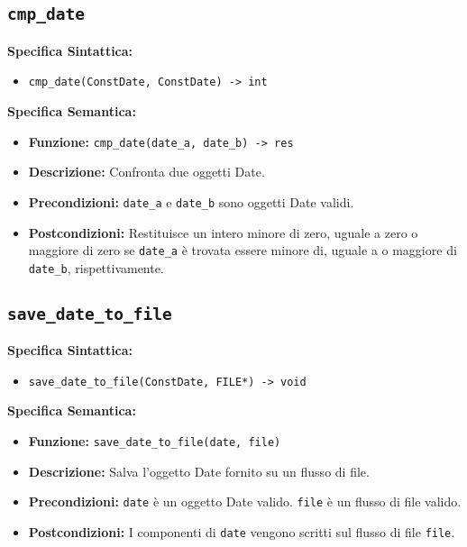 \documentclass{article}
\begin{document}

\subsection{\texttt{cmp\_date}}

\textbf{Specifica Sintattica:}
\begin{itemize}
    \item \texttt{cmp\_date(ConstDate, ConstDate) -> int}
\end{itemize}

\textbf{Specifica Semantica:}
\begin{itemize}
    \item \textbf{Funzione:} \texttt{cmp\_date(date\_a, date\_b) -> res}
    \item \textbf{Descrizione:} Confronta due oggetti Date.
    \item \textbf{Precondizioni:} \texttt{date\_a} e \texttt{date\_b} sono oggetti Date validi.
    \item \textbf{Postcondizioni:} Restituisce un intero minore di zero, uguale a zero o maggiore di zero se \texttt{date\_a} è trovata essere minore di, uguale a o maggiore di \texttt{date\_b}, rispettivamente.
\end{itemize}

\subsection{\texttt{save\_date\_to\_file}}

\textbf{Specifica Sintattica:}
\begin{itemize}
    \item \texttt{save\_date\_to\_file(ConstDate, FILE*) -> void}
\end{itemize}

\textbf{Specifica Semantica:}
\begin{itemize}
    \item \textbf{Funzione:} \texttt{save\_date\_to\_file(date, file)}
    \item \textbf{Descrizione:} Salva l'oggetto Date fornito su un flusso di file.
    \item \textbf{Precondizioni:} \texttt{date} è un oggetto Date valido. \texttt{file} è un flusso di file valido.
    \item \textbf{Postcondizioni:} I componenti di \texttt{date} vengono scritti sul flusso di file \texttt{file}.
\end{itemize}
\end{document}
